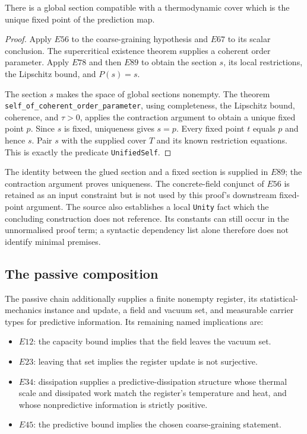 \begin{claim}
There is a global section compatible with a thermodynamic cover which is the
unique fixed point of the prediction map.
\end{claim}
\begin{proof}
Apply $E56$ to the coarse-graining hypothesis and $E67$ to its scalar
conclusion. The supercritical existence theorem supplies a coherent order
parameter. Apply $E78$ and then $E89$ to obtain the section $s$, its local
restrictions, the Lipschitz bound, and $P(s)=s$.

The section $s$ makes the space of global sections nonempty. The theorem
\nolinkurl{self_of_coherent_order_parameter}, using completeness, the
Lipschitz bound, coherence, and $\tau>0$, applies the contraction argument to
obtain a unique fixed point $p$. Since $s$ is fixed, uniqueness gives $s=p$.
Every fixed point $t$ equals $p$ and hence $s$. Pair $s$ with the supplied
cover $T$ and its known restriction equations. This is exactly the predicate
\texttt{UnifiedSelf}.
\end{proof}
\scope The identity between the glued section and a fixed section is supplied
in $E89$; the contraction argument proves uniqueness. The concrete-field
conjunct of $E56$ is retained as an input constraint but is not used by this
proof's downstream fixed-point argument. The source also establishes a local
\texttt{Unity} fact which the concluding construction does not reference.
Its constants can still occur in the unnormalised proof term; a syntactic
dependency list alone therefore does not identify minimal premises.

\subsection{The passive composition}
The passive chain additionally supplies a finite nonempty register, its
statistical-mechanics instance and update, a field and vacuum set, and measurable
carrier types for predictive information. Its remaining named implications are:
\begin{itemize}
\item $E12$: the capacity bound implies that the field leaves the vacuum set.
\item $E23$: leaving that set implies the register update is not surjective.
\item $E34$: dissipation supplies a predictive-dissipation structure whose
thermal scale and dissipated work match the register's temperature and heat,
and whose nonpredictive information is strictly positive.
\item $E45$: the predictive bound implies the chosen coarse-graining statement.
\end{itemize}

